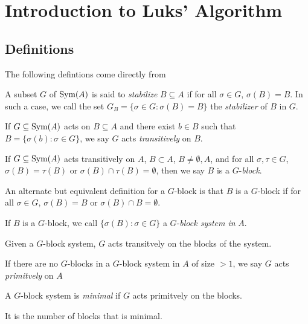 \section{Introduction to Luks' Algorithm}
\subsection{Definitions}
The following defintions come directly from \cite{luks1982}
\begin{definition}
    A subset $G$ of $\text{Sym}(A)$ is said to \textit{stabilize} $B\subseteq A$ if for all $\sigma\in G$, $\sigma(B)=B$. In such a case, we call the set $G_B=\{\sigma\in G:\sigma(B)=B\}$ the \textit{stabilizer} of $B$ in $G$. 
\end{definition}
\begin{definition}
    If $G\subseteq\text{Sym}(A)$ acts on $B\subseteq A$ and there exist $b\in B$ such that $B=\{\sigma(b):\sigma\in G\}$, we say $G$ acts \textit{transitively} on $B$.
\end{definition}
\begin{definition}
    If $G\subseteq\text{Sym}(A)$ acts transitively on $A$, $B\subset A$, $B\ne\emptyset, A$, and for all $\sigma,\tau\in G$, $\sigma(B)=\tau(B)$ or $\sigma(B)\cap\tau(B)=\emptyset$, then we say $B$ is a $G$-\textit{block}.
\end{definition}
\begin{remark}
    An alternate but equivalent definition for a $G$-block is that $B$ is a $G$-block if for all $\sigma\in G$, $\sigma(B)=B$ or $\sigma(B)\cap B=\emptyset$.
\end{remark}
\begin{definition}
    If $B$ is a $G$-block, we call $\{\sigma(B):\sigma\in G\}$ a $G$-\textit{block system in} $A$.
\end{definition}
\begin{remark}
    Given a $G$-block system, $G$ acts transitvely on the blocks of the system.
\end{remark}
\begin{definition}
    If there are no $G$-blocks in a $G$-block system in $A$ of size $>1$, we say $G$ acts \textit{primitvely} on $A$
\end{definition}
\begin{definition}
    A $G$-block system is \textit{minimal} if $G$ acts primitvely on the blocks.
\end{definition}
\begin{remark}
    It is the number of blocks that is minimal.
\end{remark}
